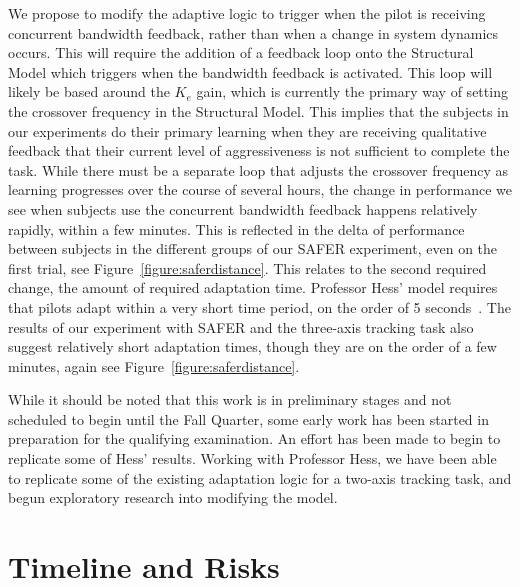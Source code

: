 We propose to modify the adaptive logic to trigger when the pilot is receiving concurrent bandwidth feedback, rather than when a change in system dynamics occurs.
This will require the addition of a feedback loop onto the Structural Model which triggers when the bandwidth feedback is activated.
This loop will likely be based around the $K_e$ gain, which is currently the primary way of setting the crossover frequency in the Structural Model.
This implies that the subjects in our experiments do their primary learning when they are receiving qualitative feedback that their current level of aggressiveness is not sufficient to complete the task.
While there must be a separate loop that adjusts the crossover frequency as learning progresses over the course of several hours, the change in performance we see when subjects use the concurrent bandwidth feedback happens relatively rapidly, within a few minutes.
This is reflected in the delta of performance between subjects in the different groups of our SAFER experiment, even on the first trial, see Figure~\ref{figure:saferdistance}.
This relates to the second required change, the amount of required adaptation time.
Professor Hess' model requires that pilots adapt within a very short time period, on the order of 5 seconds~\citep{weir_model_1966}.
The results of our experiment with SAFER and the three-axis tracking task also suggest relatively short adaptation times, though they are on the order of a few minutes, again see Figure~\ref{figure:saferdistance}.

While it should be noted that this work is in preliminary stages and not scheduled to begin until the Fall Quarter, some early work has been started in preparation for the qualifying examination.
An effort has been made to begin to replicate some of Hess' results.
Working with Professor Hess, we have been able to replicate some of the existing adaptation logic for a two-axis tracking task, and begun exploratory research into modifying the model.

% 

\section{Timeline and Risks}

